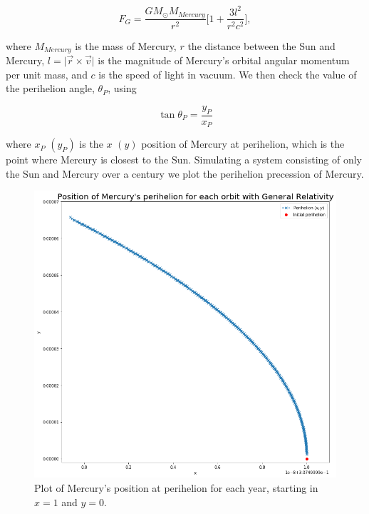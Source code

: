 \documentclass[a4paper, fontsize=11pt]{article}
\begin{document}
\begin{equation}
F_{G} = \dfrac{G M_{\odot} M_{Mercury}}{r^2}\Big[1 + \dfrac{3l^2}{r^2c^2} \Big],
\end{equation}

where $M_{Mercury}$ is the mass of Mercury, $r$ the distance between the Sun and Mercury, $l = \lvert \vec{r} \times \vec{v} \rvert$ is the magnitude of Mercury's orbital angular momentum per unit mass, and $c$ is the speed of light in vacuum. We then check the value of the perihelion angle, $\theta_{P}$, using

\begin{equation}
\tan \theta_{P} = \dfrac{y_{P}}{x_{P}}
\end{equation}

where $x_{P}$ $(y_{P})$ is the $x$ $(y)$ position of Mercury at perihelion, which is the point where Mercury is closest to the Sun. Simulating a system consisting of only the Sun and Mercury over a century we plot the perihelion precession of Mercury.

\begin{figure}[H]
\centering
\includegraphics[scale=0.45]{plots/GeneralRelativityMercury}
\caption{Plot of Mercury's position at perihelion for each year, starting in $x=1$ and $y=0$.}
\label{GRMercury}
\end{figure}
\end{document}
